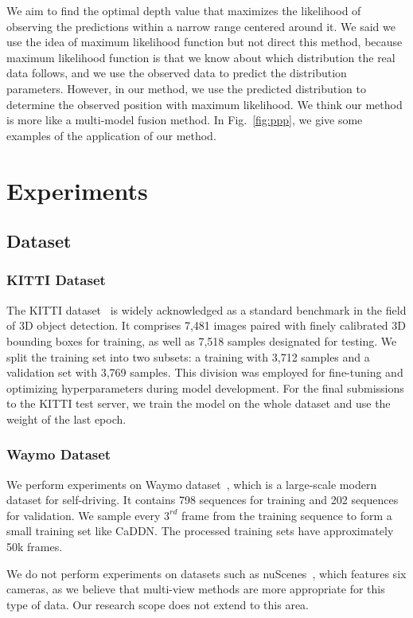 \documentclass[journal]{IEEEtran}
\begin{document}
	We aim to find the optimal depth value that maximizes the likelihood of observing the predictions within a narrow range centered around it. We said we use the idea of maximum likelihood function but not direct this method, because maximum likelihood function is that we know about which distribution the real data follows, and we use the observed data to predict the distribution parameters. However, in our method, we use the predicted distribution to determine the observed position with maximum likelihood. We think our method is more like a multi-model fusion method. In Fig.~\ref{fig:ppp}, we give some examples of the application of our method.
	
	\section{Experiments}\label{sec:exp}
	\subsection{Dataset}
	\subsubsection{KITTI Dataset}
	The KITTI dataset~\cite{kitti} is widely acknowledged as a standard benchmark in the field of 3D object detection. It comprises 7,481 images paired with finely calibrated 3D bounding boxes for training, as well as 7,518 samples designated for testing. We split the training set into two subsets: a training with 3,712 samples and a validation set with 3,769 samples. This division was employed for fine-tuning and optimizing hyperparameters during model development. For the final submissions to the KITTI test server, we train the model on the whole dataset and use the weight of the last epoch.
	
	\subsubsection{Waymo Dataset}
	We perform experiments on Waymo dataset~\cite{waymo}, which is a large-scale modern dataset for self-driving. It contains 798 sequences for training and 202 sequences for validation. We sample every $3^{rd}$ frame from the training sequence to form a small training set like CaDDN. The processed training sets have approximately 50k frames.
	
	We do not perform experiments on datasets such as nuScenes~\cite{caesar2020nuscenes}, which features six cameras, as we believe that multi-view methods are more appropriate for this type of data. Our research scope does not extend to this area.
	
\end{document}
